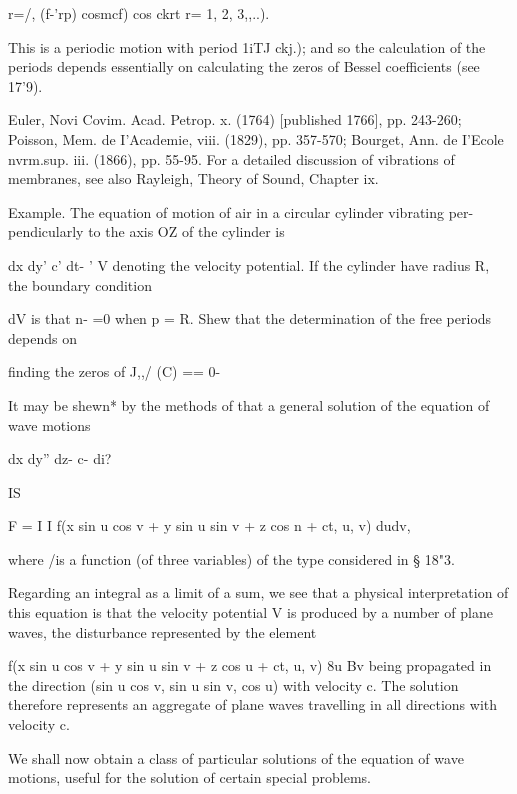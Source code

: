 r=/, (f-'rp) cosmcf) cos ckrt r= 1, 2, 3,,..).

This is a periodic motion with period 1iTJ ckj.); and so the
calculation of the periods depends essentially on calculating the
zeros of Bessel coefficients (see 17'9).

 Euler, Novi Covim. Acad. Petrop. x. (1764) [published 1766], pp.
243-260; Poisson, Mem. de I'Academie, viii. (1829), pp. 357-570;
Bourget, Ann. de I'Ecole nvrm.sup. iii. (1866), pp. 55-95. For a
detailed discussion of vibrations of membranes, see also Rayleigh,
Theory of Sound, Chapter ix.

%
%

Example. The equation of motion of air in a circular cylinder
vibrating per- pendicularly to the axis OZ of the cylinder is

dx dy' c' dt- ' V denoting the velocity potential. If the cylinder
have radius R, the boundary condition

dV is that n- =0 when p = R. Shew that the determination of the free
periods depends on

finding the zeros of J,,/ (C) == 0-

It may be
shewn* by the methods of  that a general solution of the equation
of wave motions

dx dy'' dz- c- di?

IS

F = I I f(x sin u cos v + y sin u sin v + z cos n + ct, u, v) dudv,

where /is a function (of three variables) of the type considered in §
18"3.

Regarding an integral as a limit of a sum, we see that a physical
interpretation of this equation is that the velocity potential V is
produced by a number of plane waves, the disturbance represented by
the element

f(x sin u cos v + y sin u sin v + z cos u + ct, u, v) 8u Bv being
propagated in the direction (sin u cos v, sin u sin v, cos u) with
velocity c. The solution therefore represents an aggregate of plane
waves travelling in all directions with velocity c.


We shall now obtain a class of particular solutions of the equation of
wave motions, useful for the solution of certain special problems.

